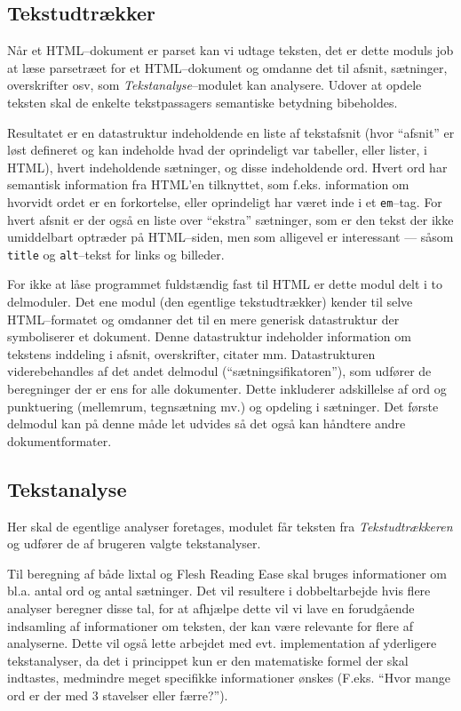 \documentclass[a4paper,oneside,article]{memoir}
\begin{document}
\subsection{Tekstudtrækker}
Når et HTML--dokument er parset kan vi udtage teksten, det er dette
moduls job at læse parsetræet for et HTML--dokument og omdanne det til
afsnit, sætninger, overskrifter osv, som \textit{Tekstanalyse}--modulet
kan analysere. Udover at opdele teksten skal de enkelte tekstpassagers
semantiske betydning bibeholdes.

Resultatet er en datastruktur indeholdende en liste af tekstafsnit
(hvor ``afsnit'' er løst defineret og kan indeholde hvad der
oprindeligt var tabeller, eller lister, i HTML), hvert indeholdende
sætninger, og disse indeholdende ord. Hvert ord har semantisk
information fra HTML'en tilknyttet, som f.eks. information om hvorvidt
ordet er en forkortelse, eller oprindeligt har været inde i et
\texttt{em}--tag. For hvert afsnit er der også en liste over
``ekstra'' sætninger, som er den tekst der ikke umiddelbart optræder
på HTML--siden, men som alligevel er interessant --- såsom
\texttt{title} og \texttt{alt}--tekst for links og billeder.

For ikke at låse programmet fuldstændig fast til HTML er dette modul
delt i to delmoduler. Det ene modul (den egentlige tekstudtrækker)
kender til selve HTML--formatet og omdanner det til en mere generisk
datastruktur der symboliserer et dokument. Denne datastruktur
indeholder information om tekstens inddeling i afsnit, overskrifter,
citater mm. Datastrukturen viderebehandles af det andet delmodul
(``sætningsifikatoren''), som udfører de beregninger der er ens for
alle dokumenter. Dette inkluderer adskillelse af ord og punktuering
(mellemrum, tegnsætning mv.) og opdeling i sætninger.  Det første
delmodul kan på denne måde let udvides så det også kan håndtere andre
dokumentformater.

\subsection{Tekstanalyse}
Her skal de egentlige analyser foretages, modulet får teksten fra
\textit{Tekstudtrækkeren} og udfører de af brugeren valgte
tekstanalyser.

Til beregning af både lixtal og Flesh Reading Ease skal bruges
informationer om bl.a. antal ord og antal sætninger. Det vil resultere
i dobbeltarbejde hvis flere analyser beregner disse tal, for at
afhjælpe dette vil vi lave en forudgående indsamling af informationer
om teksten, der kan være relevante for flere af analyserne. Dette vil
også lette arbejdet med evt. implementation af yderligere
tekstanalyser, da det i princippet kun er den matematiske formel der
skal indtastes, medmindre meget specifikke informationer ønskes
(F.eks. ``Hvor mange ord er der med 3 stavelser eller færre?'').
\end{document}
